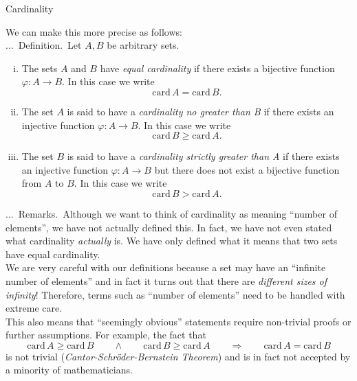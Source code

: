 \documentclass[smaller,hyperref={CJKbookmarks=true}]{beamer}
\newcounter{zhuo}[subsection]
\renewcommand{\thezhuo}{\thesection.\thesubsection.\arabic{zhuo}}
\newenvironment{DEFINITION}{\stepcounter{zhuo}\alert{\thezhuo.~Definition.\,}}{}
\newenvironment{REMARKS}{\stepcounter{zhuo}\alert{\thezhuo.~Remarks.\,}}{}
\begin{document}
\begin{frame}{Cardinality}
\begin{spacing}{0.9}
We can make this more precise as follows:\\[4pt]
\begin{DEFINITION}
Let $A,B$ be arbitrary sets.
\begin{enumerate}[(i)]
  \item The sets $A$ and $B$ have \emph{equal cardinality} if there exists a bijective function $\varphi\!:A\rightarrow B$. In this case we write
      \[\text{card}\,A=\text{card}\,B.\]
  \item The set $A$ is said to have a \emph{cardinality no greater than B} if there exists an injective function $\varphi\!:A\rightarrow B$. In this case we write
      \[\text{card}\,B\geq\text{card}\,A.\]
  \item The set $B$ is said to have a \emph{cardinality strictly greater than A} if there exists an injective function $\varphi\!:A\rightarrow B$ but there does not exist a bijective function from $A$ to $B$. In this case we write
      \[\text{card}\,B>\text{card}\,A.\]
\end{enumerate}
\end{DEFINITION}
\end{spacing}
\newpage
\begin{spacing}{1.05}
\begin{REMARKS}
Although we want to think of cardinality as meaning
``number of elements'', we have not actually defined this. In fact, we have
not even stated what cardinality \emph{actually} is. We have only defined what it
means that two sets have equal cardinality.\\[5pt]
We are very careful with our definitions because a set may have an
``infinite number of elements'' and in fact it turns out that there are
\emph{different sizes of infinity}! Therefore, terms such as ``number of elements''
need to be handled with extreme care.\\[5pt]
This also means that ``seemingly obvious'' statements require non-trivial
proofs or further assumptions. For example, the fact that
\[\text{card}\,A\geq\text{card}\,B\qquad\wedge
\qquad\text{card}\,B\geq\text{card}\,A\qquad
\Rightarrow\qquad\text{card}\,A=\text{card}\,B\]
is not trivial (\emph{Cantor-Schr\"{o}der-Bernstein Theorem}) and is in fact not
accepted by a minority of mathematicians.
\end{REMARKS}
\end{spacing}
\end{frame}
\end{document}
